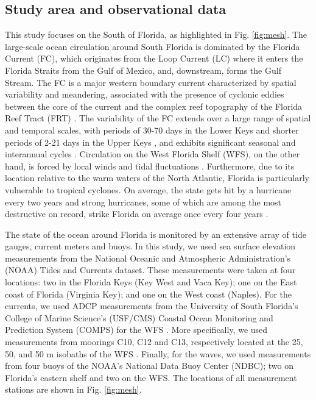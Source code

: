 \documentclass[preprint,12pt,authoryear]{elsarticle}
\begin{document}
\subsection{Study area and observational data}
This study focuses on the South of Florida, as highlighted in Fig. \ref{fig:mesh}. The large-scale ocean circulation around South Florida is dominated by the Florida Current (FC), which originates from the Loop Current (LC) where it enters the Florida Straits from the Gulf of Mexico, and, downstream, forms the Gulf Stream. The FC is a major western boundary current characterized by spatial variability and meandering, associated with the presence of cyclonic eddies between the core of the current and the complex reef topography of the Florida Reef Tract (FRT) \citep{lee1995florida,kourafalou2012florida}. The variability of the FC extends over a large range of spatial and temporal scales, with periods of 30-70 days in the Lower Keys \citep{lee1995florida} and shorter periods of 2-21 days in the Upper Keys \citep{lee1977low}, and exhibits significant seasonal and interannual cycles \citep{johns1987meandering, lee1988wind,schott1988variability}. Circulation on the West Florida Shelf (WFS), on the other hand, is forced by local winds and tidal fluctuations \citep{lee2002volume,liu2012seasonal}. Furthermore, due to its location relative to the warm waters of the North Atlantic, Florida is particularly vulnerable to tropical cyclones. On average, the state gets hit by a hurricane every two years and strong hurricanes, some of which are among the most destructive on record, strike Florida on average once every four years \citep{malmstadt2009florida}.

The state of the ocean around Florida is monitored by an extensive array of tide gauges, current meters and buoys. In this study, we used sea surface elevation measurements from the National Oceanic and Atmospheric Administration’s (NOAA) Tides and Currents dataset. These measurements were taken at four locations: two in the Florida Keys (Key West and Vaca Key); one on the East coast of Florida (Virginia Key); and one on the West coast (Naples). For the currents, we used ADCP measurements from the University of South Florida's College of Marine Science's (USF/CMS) Coastal Ocean Monitoring and Prediction System (COMPS) for the WFS \citep{weisberg2009mean}. More specifically, we used measurements from moorings C10, C12 and C13, respectively located at the 25, 50, and 50 m isobaths of the WFS \citep{liu2020impacts}. Finally, for the waves, we used measurements from four buoys of the NOAA's National Data Buoy Center (NDBC); two on Florida's eastern shelf and two on the WFS. The locations of all measurement stations are shown in Fig. \ref{fig:mesh}.
\end{document}
